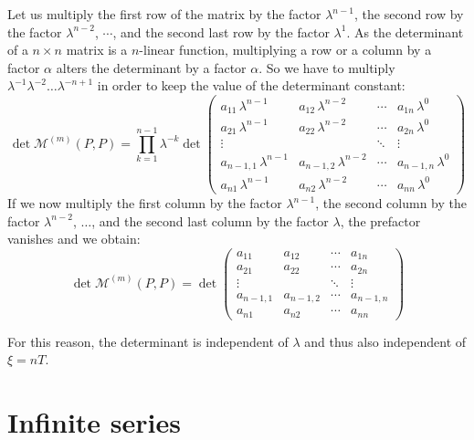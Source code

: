 Let us multiply the first row of the matrix by the factor $\lambda^{n-1}$,
the second row by the factor $\lambda^{n-2}$, $\cdots$, and the second last
row by the factor $\lambda^1$.
As the determinant of a $n\times n$ matrix is a $n$-linear function,
multiplying a row or a column by a factor $\alpha$ alters the determinant by
a factor $\alpha$.
So we have to multiply $\lambda^{-1}\lambda^{-2}\dots\lambda^{-n+1}$
in order to keep the value of the determinant constant:
\begin{equation}
\det \mathcal{M}^{(m)}(P,P) = \prod_{k=1}^{n-1} \lambda^{-k} \det\left(
\begin{array}{cccc}
a_{11}\,\lambda^{n-1}    & a_{12}\,\lambda^{n-2}    & \cdots & a_{1n}\,\lambda^0    \\
a_{21}\,\lambda^{n-1}    & a_{22}\,\lambda^{n-2}    & \cdots & a_{2n}\,\lambda^0    \\
\vdots               &                      & \ddots & \vdots           \\
a_{n-1,1}\,\lambda^{n-1} & a_{n-1,2}\,\lambda^{n-2} & \cdots & a_{n-1,n}\,\lambda^0 \\
a_{n1}\,\lambda^{n-1}    & a_{n2}\,\lambda^{n-2}    & \cdots & a_{nn}\,\lambda^0
\end{array}
\right)
\end{equation}
If we now multiply the first column by the factor $\lambda^{n-1}$, the second column by 
the factor $\lambda^{n-2}$, $\dots$, and the second last column by the factor $\lambda$, the
prefactor vanishes and we obtain:
\begin{equation}
\det \mathcal{M}^{(m)}(P,P) = \det\left(
\begin{array}{cccc}
a_{11} & a_{12} & \cdots & a_{1n} \\
a_{21} & a_{22} & \cdots & a_{2n} \\
\vdots &        & \ddots & \vdots \\
a_{n-1,1} & a_{n-1,2} & \cdots & a_{n-1,n} \\
a_{n1} & a_{n2} & \cdots & a_{nn}
\end{array}
\right)
\end{equation}

For this reason, the determinant is independent of $\lambda$ and thus
also independent of $\xi=nT$.


\section{Infinite series}

